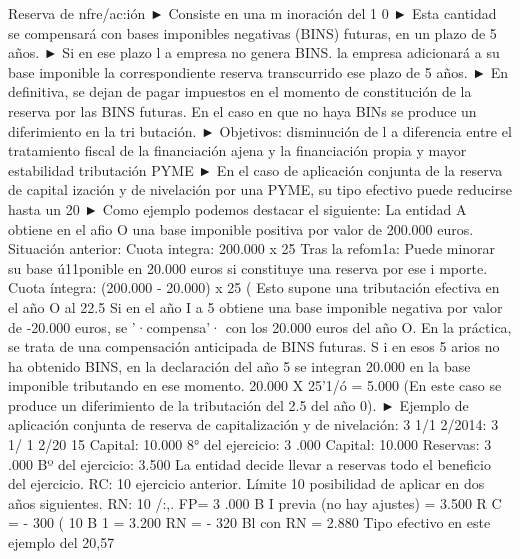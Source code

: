 \documentclass[10pt,a4paper]{article}
\begin{document}
Reserva de nfre/ac:ión
► Consiste en una m inoración del 1 0%
► Esta cantidad se compensará con bases imponibles negativas (BINS) futuras, en un plazo de 5 años.
► Si en ese plazo l a empresa no genera BINS. la empresa adicionará a su base imponible la correspondiente reserva transcurrido ese plazo de 5 años.
► En definitiva, se dejan de pagar impuestos en el momento de constitución de la reserva por las BINS futuras. En el caso en que no haya BINs se produce un diferimiento en la tri butación.
► Objetivos: disminución de l a diferencia entre el tratamiento fiscal de la financiación ajena y la financiación propia y mayor estabilidad tributación PYME
► En el caso de aplicación conjunta de la reserva de capital ización y de nivelación por una PYME, su tipo efectivo puede reducirse hasta un 20%
► Como ejemplo podemos destacar el siguiente:
La entidad A obtiene en el afio O una base imponible positiva por valor de 200.000 euros.
Situación anterior:
Cuota integra: 200.000 x 25%
Tras la refom1a:
Puede minorar su base ú11ponible en 20.000 euros si constituye una reserva por ese
i mporte.
Cuota íntegra: (200.000 - 20.000) x 25%
( Esto supone una tributación efectiva en el año O al 22.5%
Si en el año I a 5 obtiene una base imponible negativa por valor de -20.000 euros, se
'·compensa'· con los 20.000 euros del año O. En la práctica, se trata de una compensación
anticipada de BINS futuras.
S i en esos 5 arios no ha obtenido BINS, en la declaración del año 5 se integran 20.000 en
la base imponible tributando en ese momento.
20.000 X 25'1/ó = 5.000
(En este caso se produce un diferimiento de la tributación del 2.5%
del año 0).
► Ejemplo de aplicación conjunta de reserva de capitalización y de nivelación:
3 1/1 2/2014: 3 1/ 1 2/20 15
Capital: 10.000
8° del ejercicio: 3 .000
Capital: 10.000
Reservas: 3 .000
Bº del ejercicio: 3.500
La entidad decide llevar a reservas todo el beneficio del ejercicio.
RC: 10%
ejercicio anterior.
Límite 10%
posibilidad de aplicar en dos años siguientes.
RN: 10%
/:,. FP= 3 .000
B I previa (no hay ajustes) = 3.500
R C = - 300 ( 10%
B 1 = 3.200 RN = - 320 Bl con RN = 2.880 Tipo efectivo en este ejemplo del 20,57%
\end{document}
